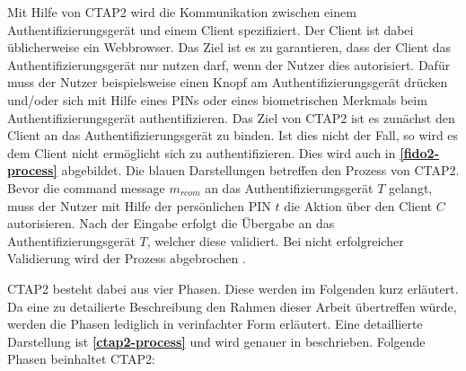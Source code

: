 Mit Hilfe von \ac{CTAP2} wird die Kommunikation zwischen einem Authentifizierungsgerät und einem Client spezifiziert. Der Client ist dabei üblicherweise ein Webbrowser. Das Ziel ist es zu garantieren, dass der Client das Authentifizierungsgerät nur nutzen darf, wenn der Nutzer dies autorisiert. Dafür muss der Nutzer beispielsweise einen Knopf am Authentifizierungsgerät drücken und/oder sich mit Hilfe eines PINs oder eines biometrischen Merkmals beim Authentifizierungsgerät authentifizieren. Das Ziel von \ac{CTAP2} ist es zunächst den Client an das Authentifizierungsgerät zu binden. Ist dies nicht der Fall, so wird es dem Client nicht ermöglicht sich zu authentifizieren. Dies wird auch in \textbf{\ref{fido2-process}} abgebildet. Die blauen Darstellungen betreffen den Prozess von \ac{CTAP2}. Bevor die command message $m_{rcom}$ an das Authentifizierungsgerät $T$ gelangt, muss der Nutzer mit Hilfe der persönlichen PIN $t$ die Aktion über den  Client $C$ autorisieren. Nach der Eingabe erfolgt die Übergabe an das Authentifizierungsgerät $T$, welcher diese validiert. Bei nicht erfolgreicher Validierung wird der Prozess abgebrochen \cite{barbosa2021provable}.

\ac{CTAP2} besteht dabei aus vier Phasen. Diese werden im Folgenden kurz erläutert. Da eine zu detailierte Beschreibung den Rahmen dieser Arbeit übertreffen würde, werden die Phasen lediglich in verinfachter Form erläutert. Eine detaillierte Darstellung ist \textbf{\ref{ctap2-process}} und wird genauer in \cite{barbosa2021provable} beschrieben. Folgende Phasen beinhaltet \ac{CTAP2}:


